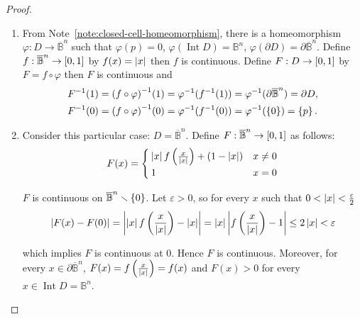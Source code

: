 \begin{proof}
	\begin{enumerate}[label={(\alph*)}]
		\item From Note~\ref{note:closed-cell-homeomorphism}, there is a homeomorphism \( \varphi: D \to \overline{\mathbb{B}}^{n} \) such that \( \varphi(p) = 0 \), \( \varphi(\operatorname{Int}D) = \mathbb{B}^{n} \), \( \varphi(\partial D) = \partial\overline{\mathbb{B}}^{n} \). Define \( f: \overline{\mathbb{B}}^{n} \to \left[{0, 1}\right] \) by \( f(x) = \left\vert{x}\right\vert \) then \( f \) is continuous. Define \( F: D \to \left[{0, 1}\right] \) by \( F = f\circ \varphi \) then \( F \) is continuous and
		      \begin{align*}
			      F^{-1}(1) & = {(f\circ \varphi)}^{-1}(1) = \varphi^{-1}(f^{-1}(1)) = \varphi^{-1}(\partial\overline{\mathbb{B}}^{n}) = \partial D, \\
			      F^{-1}(0) & = {(f\circ \varphi)}^{-1}(0) = \varphi^{-1}(f^{-1}(0)) = \varphi^{-1}(\left\{{0}\right\}) = \left\{{p}\right\}.
		      \end{align*}
		\item Consider this particular case: \( D = \overline{\mathbb{B}}^{n} \). Define \( F: \overline{\mathbb{B}}^{n} \to \left[{0, 1}\right] \) as follows:
		      \begin{align*}
			      F(x) = \begin{cases}
				             \left\vert{x}\right\vert f\left(\frac{x}{\left\vert{x}\right\vert}\right) + (1 - \left\vert{x}\right\vert) & x \ne 0 \\
				             1                                                      & x = 0
			             \end{cases}
		      \end{align*}

		      \( F \) is continuous on \( \overline{\mathbb{B}}^{n}\smallsetminus\left\{{0}\right\} \). Let \( \varepsilon > 0 \), so for every \( x \) such that \( 0 < \left\vert{x}\right\vert < \frac{\varepsilon}{2} \)
		      \begin{align*}
			      \left\vert{F(x) - F(0)}\right\vert = \left\vert{\left\vert{x}\right\vert f\left(\frac{x}{\left\vert{x}\right\vert}\right) - \left\vert{x}\right\vert}\right\vert = \left\vert{x}\right\vert \left\vert{f\left(\frac{x}{\left\vert{x}\right\vert}\right) - 1}\right\vert \leq 2\left\vert{x}\right\vert < \varepsilon
		      \end{align*}

		      which implies \( F \) is continuous at 0. Hence \( F \) is continuous. Moreover, for every \( x \in \partial \overline{\mathbb{B}}^{n} \), \( F(x) = f\left(\frac{x}{\left\vert{x}\right\vert}\right) = f(x) \) and \( F(x) > 0 \) for every \( x \in \operatorname{Int} D = \mathbb{B}^{n} \).


\end{enumerate}
\end{proof}
